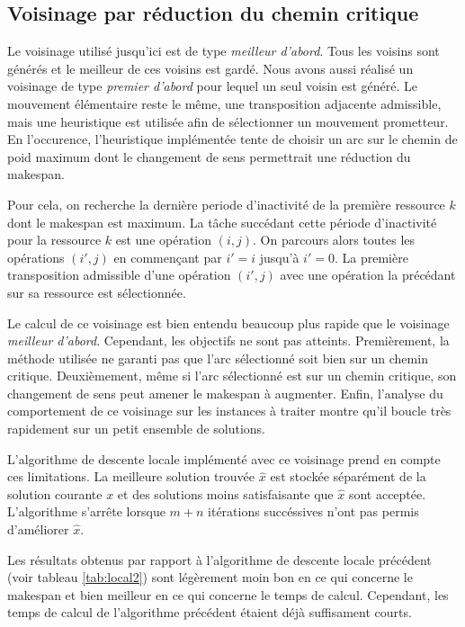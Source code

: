\documentclass[french]{rapport}
\begin{document}
\subsection{Voisinage par réduction du chemin critique}

Le voisinage utilisé jusqu'ici est de type \emph{meilleur d'abord}. Tous les voisins sont générés et
le meilleur de ces voisins est gardé. Nous avons aussi réalisé un voisinage de type
\emph{premier d'abord} pour lequel un seul voisin est généré. Le mouvement élémentaire reste le
même, une transposition adjacente admissible, mais une heuristique est utilisée afin de sélectionner
un mouvement prometteur. En l'occurence, l'heuristique implémentée tente de choisir un arc sur le chemin
de poid maximum dont le changement de sens permettrait une réduction du makespan.

Pour cela, on recherche la dernière periode d'inactivité de la première ressource $k$ dont le
makespan est maximum. La tâche succédant cette période d'inactivité pour la ressource $k$ est une
opération $(i,j)$. On parcours alors toutes les opérations $(i',j)$ en commençant par $i' = i$
jusqu'à $i' = 0$. La première transposition admissible d'une opération $(i',j)$ avec une opération
la précédant sur sa ressource est sélectionnée.

Le calcul de ce voisinage est bien entendu beaucoup plus rapide que le voisinage \emph{meilleur
d'abord}. Cependant, les objectifs ne sont pas atteints. Premièrement, la méthode utilisée ne garanti
pas que l'arc sélectionné soit bien sur un chemin critique. Deuxièmement, même si l'arc sélectionné
est sur un chemin critique, son changement de sens peut amener le makespan à augmenter. Enfin,
l'analyse du comportement de ce voisinage sur les instances à traiter montre qu'il boucle très
rapidement sur un petit ensemble de solutions.

L'algorithme de descente locale implémenté avec ce voisinage prend en compte ces limitations. La
meilleure solution trouvée $\hat{x}$ est stockée séparément de la solution courante $x$ et des
solutions moins satisfaisante que $\hat{x}$ sont acceptée. L'algorithme s'arrête lorsque $m + n$
itérations succéssives n'ont pas permis d'améliorer $\hat{x}$.

Les résultats obtenus par rapport à l'algorithme de descente locale précédent (voir tableau
\ref{tab:local2}) sont légèrement moin bon en ce qui concerne le makespan et bien meilleur en ce qui
concerne le temps de calcul. Cependant, les temps de calcul de l'algorithme précédent étaient
déjà suffisament courts. 
\end{document}
